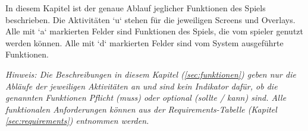 
In diesem Kapitel ist der genaue Ablauf jeglicher Funktionen des Spiels beschrieben. Die Aktivitäten ‘u‘ stehen für die jeweiligen Screens und Overlays. 
Alle mit ‘a‘ markierten Felder sind Funktionen des Spiels, die vom \gls{spieler} genutzt werden können. Alle mit ‘d‘ markierten Felder sind vom System ausgeführte Funktionen. 
 
\textit{
    Hinweis: Die Beschreibungen in diesem Kapitel (\ref{sec:funktionen}) geben nur die Abläufe der jeweiligen Aktivitäten an und
    sind kein Indikator dafür, ob die genannten Funktionen Pflicht (\gls{muss}) oder optional (\gls{sollte} / \gls{kann}) sind.
    Alle funktionalen Anforderungen können aus der Requirements-Tabelle (Kapitel \ref{sec:requirements}) entnommen werden.  
}
